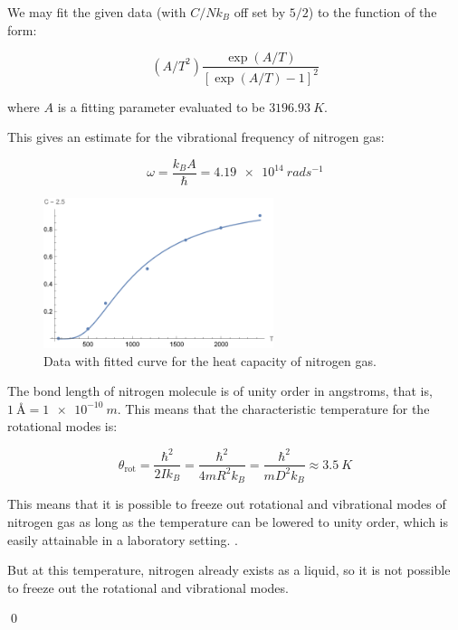 \documentclass[12pt]{article}
\begin{document}
We may fit the given data (with $C/Nk_{B}$ off set by $5/2$) to the function of the form:

\begin{equation}
    \left( A/T^{2} \right) \frac{\exp\left( A/T \right)}{\left[ \exp\left( A/T \right) - 1 \right]^{2}}
\end{equation}

where $A$ is a fitting parameter evaluated to be $\qty{3196.93}{K}$.

This gives an estimate for the vibrational frequency of nitrogen gas:

\begin{equation}
    \omega = \frac{k_{B}A}{\hbar} = \qty{4.19e14}{rads^{-1}}
\end{equation}

\begin{figure}[h]
    \centering
    \includegraphics[width=0.6\textwidth]{../plots/statistics_3_2_a.png}
    \caption{Data with fitted curve for the heat capacity of nitrogen gas.}
\end{figure}

The bond length of nitrogen molecule is of unity order in angstroms, that is, $\qty{1}{\angstrom} = \qty{1e-10}{m}$. This means that the characteristic temperature for the rotational modes is:

\begin{equation}
    \theta_{\text{rot}} = \frac{\hbar^{2}}{2I k_{B}} = \frac{\hbar^{2}}{4mR^{2} k_{B}} = \frac{\hbar^{2}}{mD^{2} k_{B}} \approx \qty{3.5}{K}
\end{equation}

This means that it is possible to freeze out rotational and vibrational modes of nitrogen gas as long as the temperature can be lowered to unity order, which is easily attainable in a laboratory setting. .

\begin{correction}
    But at this temperature, nitrogen already exists as a liquid, so it is not possible to freeze out the rotational and vibrational modes.
\end{correction}
\qed
\end{document}
